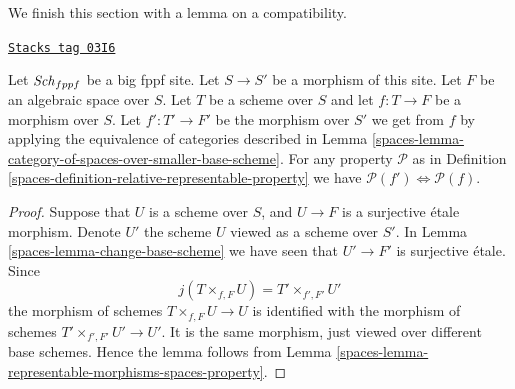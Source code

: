 We finish this section with a lemma on a compatibility.

\begin{lemma}
\label{spaces-lemma-viewed-as-properties}
\href{https://stacks.math.columbia.edu/tag/03I6}{\texttt{Stacks tag 03I6}}

Let $\mathit{Sch}_{fppf}$ be a big fppf site.
Let $S \to S'$ be a morphism of this site.
Let $F$ be an algebraic space over $S$.
Let $T$ be a scheme over $S$ and let $f : T \to F$ be
a morphism over $S$.
Let $f' : T' \to F'$ be the morphism over $S'$ we get from
$f$ by applying the equivalence of categories described in
Lemma \ref{spaces-lemma-category-of-spaces-over-smaller-base-scheme}.
For any property $\mathcal{P}$ as in
Definition \ref{spaces-definition-relative-representable-property}
we have $\mathcal{P}(f') \Leftrightarrow \mathcal{P}(f)$.
\end{lemma}

\begin{proof}

Suppose that $U$ is a scheme over $S$, and $U \to F$ is a surjective \'etale
morphism. Denote $U'$ the scheme $U$ viewed as a scheme over $S'$. In
Lemma \ref{spaces-lemma-change-base-scheme}
we have seen that $U' \to F'$ is surjective \'etale. Since
$$
j(T \times_{f, F} U) = T' \times_{f', F'} U'
$$
the morphism of schemes $T \times_{f, F} U \to U$
is identified with the morphism of schemes
$T' \times_{f', F'} U' \to U'$.
It is the same morphism, just viewed over different base schemes.
Hence the lemma follows from
Lemma \ref{spaces-lemma-representable-morphisms-spaces-property}.
\end{proof}



